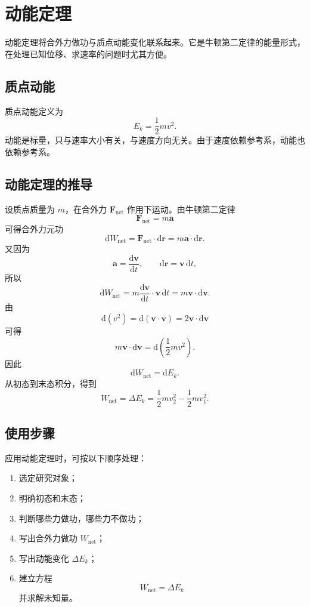 \section{动能定理}

动能定理将合外力做功与质点动能变化联系起来。它是牛顿第二定律的能量形式，在处理已知位移、求速率的问题时尤其方便。

\subsection{质点动能}

质点动能定义为
\[
    \boxed{
    E_k=\frac{1}{2}mv^2
    } .
\]
动能是标量，只与速率大小有关，与速度方向无关。由于速度依赖参考系，动能也依赖参考系。

\subsection{动能定理的推导}

设质点质量为 $m$，在合外力 $\boldsymbol F_{\mathrm{net}}$ 作用下运动。由牛顿第二定律
\[
    \boldsymbol F_{\mathrm{net}}=m\boldsymbol a
\]
可得合外力元功
\[
    \mathrm dW_{\mathrm{net}}
    =
    \boldsymbol F_{\mathrm{net}}\cdot\mathrm d\boldsymbol r
    =
    m\boldsymbol a\cdot\mathrm d\boldsymbol r .
\]
又因为
\[
    \boldsymbol a=\frac{\mathrm d\boldsymbol v}{\mathrm dt},
    \qquad
    \mathrm d\boldsymbol r=\boldsymbol v\,\mathrm dt,
\]
所以
\[
    \mathrm dW_{\mathrm{net}}
    =
    m\frac{\mathrm d\boldsymbol v}{\mathrm dt}\cdot\boldsymbol v\,\mathrm dt
    =
    m\boldsymbol v\cdot\mathrm d\boldsymbol v .
\]
由
\[
    \mathrm d(v^2)
    =
    \mathrm d(\boldsymbol v\cdot\boldsymbol v)
    =
    2\boldsymbol v\cdot\mathrm d\boldsymbol v
\]
可得
\[
    m\boldsymbol v\cdot\mathrm d\boldsymbol v
    =
    \mathrm d\left(\frac{1}{2}mv^2\right).
\]
因此
\[
    \mathrm dW_{\mathrm{net}}=\mathrm dE_k.
\]
从初态到末态积分，得到
\[
    \boxed{
    W_{\mathrm{net}}
    =
    \Delta E_k
    =
    \frac{1}{2}mv_2^2-\frac{1}{2}mv_1^2
    } .
\]

\subsection{使用步骤}

应用动能定理时，可按以下顺序处理：

\begin{enumerate}
    \item 选定研究对象；
    \item 明确初态和末态；
    \item 判断哪些力做功，哪些力不做功；
    \item 写出合外力做功 $W_{\mathrm{net}}$；
    \item 写出动能变化 $\Delta E_k$；
    \item 建立方程
    \[
        W_{\mathrm{net}}=\Delta E_k
    \]
    并求解未知量。
\end{enumerate}

